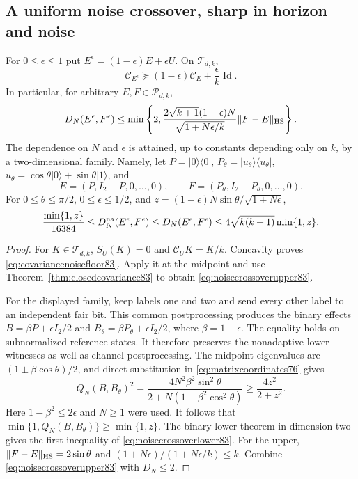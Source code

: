 \subsection{A uniform noise crossover, sharp in horizon and noise}

\begin{theorem}
\label{thm:noisecrossover83}
For $0\le\epsilon\le1$ put $E^\epsilon=(1-\epsilon)E+\epsilon U$.
On $\mathcal T_{d,k}$,
\begin{equation}\label{eq:covariancenoisefloor83}
 \mathcal C_{E^\epsilon}\succeq
       (1-\epsilon)\mathcal C_E+\frac\epsilon k\operatorname{Id}.
\end{equation}
In particular, for arbitrary $E,F\in\mathcal P_{d,k}$,
\begin{equation}\label{eq:noisecrossoverupper83}
 D_N(E^\epsilon,F^\epsilon)\le
 \min\left\{2,
 \frac{2\sqrt{k+1}(1-\epsilon)N}
      {\sqrt{1+N\epsilon/k}}\|F-E\|_{\rm HS}\right\}.
\end{equation}
The dependence on $N$ and $\epsilon$ is attained, up to constants
depending only on $k$, by a two-dimensional family.  Namely, let
$P=|0\rangle\langle0|$, $P_\theta=|u_\theta\rangle\langle u_\theta|$,
$u_\theta=\cos\theta|0\rangle+\sin\theta|1\rangle$, and
\[
 E=(P,I_2-P,0,\ldots,0),\qquad
 F=(P_\theta,I_2-P_\theta,0,\ldots,0).
\]
For $0\le\theta\le\pi/2$, $0\le\epsilon\le1/2$, and
$z=(1-\epsilon)N\sin\theta/\sqrt{1+N\epsilon}$,
\begin{equation}\label{eq:noisecrossoverlower83}
 \frac{\min\{1,z\}}{16384}
 \le D_N^{\rm na}(E^\epsilon,F^\epsilon)
 \le D_N(E^\epsilon,F^\epsilon)
 \le4\sqrt{k(k+1)}\min\{1,z\}.
\end{equation}
\end{theorem}
\begin{proof}
For $K\in\mathcal T_{d,k}$, $S_U(K)=0$ and
$\mathcal C_UK=K/k$.  Concavity proves
\eqref{eq:covariancenoisefloor83}.  Apply it at the midpoint and use
Theorem~\ref{thm:closedcovariance83} to obtain
\eqref{eq:noisecrossoverupper83}.

For the displayed family, keep labels one and two and send every
other label to an independent fair bit.  This common postprocessing
produces the binary effects
$B=\beta P+\epsilon I_2/2$ and
$B_\theta=\beta P_\theta+\epsilon I_2/2$, where $\beta=1-\epsilon$.
The equality holds on subnormalized reference states.  It therefore
preserves the nonadaptive lower witnesses as well as channel
postprocessing.  The midpoint eigenvalues are
$(1\pm\beta\cos\theta)/2$, and direct substitution in
\eqref{eq:matrixcoordinates76} gives
\[
 Q_N(B,B_\theta)^2
 =\frac{4N^2\beta^2\sin^2\theta}
             {2+N(1-\beta^2\cos^2\theta)}
 \ge\frac{4z^2}{2+z^2}.
\]
Here $1-\beta^2\le2\epsilon$ and $N\ge1$ were used.
It follows that $\min\{1,Q_N(B,B_\theta)\}\ge\min\{1,z\}$.
The binary lower theorem in dimension two gives the first inequality
of \eqref{eq:noisecrossoverlower83}.  For the upper,
$\|F-E\|_{\rm HS}=2\sin\theta$ and
$(1+N\epsilon)/(1+N\epsilon/k)\le k$.
Combine \eqref{eq:noisecrossoverupper83} with $D_N\le2$.
\end{proof}

